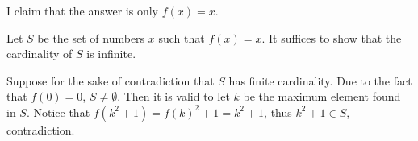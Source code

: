 I claim that the answer is only $f(x)=x$.

Let $S$ be the set of numbers $x$ such that $f(x)=x$. It suffices to show that the
cardinality of $S$ is infinite.

Suppose for the sake of contradiction that $S$ has finite cardinality. Due to
the fact that $f(0)=0$, $S\ne \emptyset$. Then it is valid to let $k$ be the maximum
element found in $S$. Notice that $f(k^2+1)=f(k)^2+1=k^2+1$, thus $k^2+1\in S$, contradiction.
